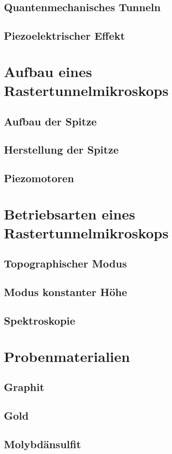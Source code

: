     \subsection{Quantenmechanisches Tunneln}
    \subsection{Piezoelektrischer Effekt}

\section{Aufbau eines Rastertunnelmikroskops}
    \subsection{Aufbau der Spitze}
    \subsection{Herstellung der Spitze}
    \subsection{Piezomotoren}

\section{Betriebsarten eines Rastertunnelmikroskops}
    \subsection{Topographischer Modus}
    \subsection{Modus konstanter Höhe}
    \subsection{Spektroskopie}

\section{Probenmaterialien}
    \subsection{Graphit}
    \subsection{Gold}
    \subsection{Molybdänsulfit}
